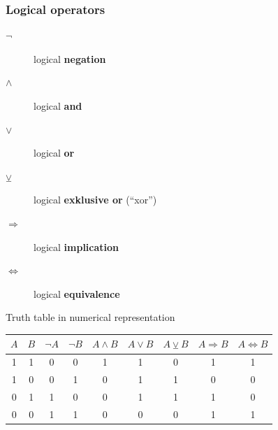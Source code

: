 \begin{frame}
 \frametitle{Logical operators}
 \begin{description}
 \item[$\neg$] logical \textbf{{negation}}  
 \item[$\wedge$] logical \textbf{{and}}
 \item[$\vee$] logical \textbf{{or}}
 \item[$\veebar$] logical \textbf{exklusive or} (``xor'')
 \item[$\Rightarrow$] logical \textbf{{implication}}
 \item[$\Leftrightarrow$] logical \textbf{{equivalence}}
\end{description}
\begin{block}{Truth table in numerical representation}
 \centering\footnotesize
 \begin{tabular}{*{9}{c}}
  \toprule
  $A$ & $B$ & $\neg A$ & $\neg B$ & $A\wedge B$ & $A\vee B$ & $A \veebar B$ & $A\Rightarrow B$ & $A\Leftrightarrow B$\\
  \midrule
  1 & 1 & 0 & 0 & 1 & 1 & 0 & 1 & 1\\
  1 & 0 & 0 & 1 & 0 & 1 & 1 & 0 & 0\\
  0 & 1 & 1 & 0 & 0 & 1 & 1 & 1 & 0\\
  0 & 0 & 1 & 1 & 0 & 0 & 0 & 1 & 1\\
  \bottomrule
 \end{tabular}
\end{block}
\end{frame}

